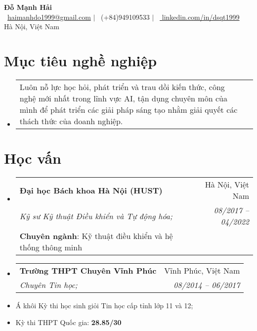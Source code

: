\documentclass[letterpaper,11pt]{article}
\makeatletter
\newcommand{\resumeItem}[1]{
  \item\small{
    {#1 \vspace{-2pt}}
  }
}
\newcommand{\resumeSubheadingobj}[1]{
  \vspace{-2pt}\item
    \begin{tabular*}{1.0\textwidth}[t]{l@{\extracolsep{\fill}}r}
      \small#1
    \end{tabular*}\vspace{-7pt}
}
\newcommand{\resumeSubheadingedu}[5]{
  \vspace{-2pt}\item
    \begin{tabular*}{1.0\textwidth}[t]{l@{\extracolsep{\fill}}r}
      \textbf{#1} & \small #2 \\
      \textit{\small#3} & \textit{\small #4} \\
      \small#5 & \\
      
    \end{tabular*}\vspace{-7pt}
}
\newcommand{\resumeSubheading}[4]{
  \vspace{-2pt}\item
    \begin{tabular*}{1.0\textwidth}[t]{l@{\extracolsep{\fill}}r}
      \textbf{#1} & \small #2 \\
      \textit{\small#3} & \textit{\small #4} \\
      
    \end{tabular*}\vspace{-7pt}
}
\newcommand{\resumeSubHeadingListStart}{\begin{itemize}[leftmargin=0.0in, label={}]}
\newcommand{\resumeSubHeadingListEnd}{\end{itemize}}
\makeatother
\begin{document}
\begin{center}
    {\Huge \textbf{Đỗ Mạnh Hải}} \\ \vspace{1pt}
    \vspace{5pt}
    \small \raisebox{-0.2\height}\faEnvelope\ \href{mailto:haimanhdo1999@gmail.com}{haimanhdo1999@gmail.com} $|$ 
    \raisebox{-0.1\height}\faPhone\ (+84)949109533 $|$ 
    \raisebox{-0.2\height}\faLinkedin\ \href{https://www.linkedin.com/in/dsqt1999/}{ linkedin.com/in/dsqt1999}  ~
    \newline   
    \small Hà Nội, Việt Nam 
    \vspace{-10pt}
    
\end{center}

\section{Mục tiêu nghề nghiệp}
  \resumeSubHeadingListStart
    \resumeSubheadingobj
      {Luôn nỗ lực học hỏi, phát triển và trau dồi kiến thức, công nghệ mới nhất trong lĩnh vực AI, tận dụng chuyên môn của mình để phát triển các giải pháp sáng tạo nhằm giải quyết các thách thức của doanh nghiệp.}
     \resumeSubHeadingListEnd

\section{Học vấn}
  \resumeSubHeadingListStart
    \resumeSubheadingedu
      {Đại học Bách khoa Hà Nội (HUST)}{Hà Nội, Việt Nam}
      {Kỹ sư Kỹ thuật Điều khiển và Tự động hóa;}{08/2017 -- 04/2022} 
      {\textbf{Chuyên ngành}: Kỹ thuật điều khiển và hệ thống thông minh}

    \resumeSubheading
      {Trường THPT Chuyên Vĩnh Phúc} {Vĩnh Phúc, Việt Nam}
      {Chuyên Tin học;} {08/2014 – 06/2017}
      \resumeItem{Á khôi Kỳ thi học sinh giỏi Tin học cấp tỉnh lớp 11 và 12;}
      \resumeItem{Kỳ thi THPT Quốc gia: \textbf{28.85/30}} 
     \resumeSubHeadingListEnd

\end{document}
